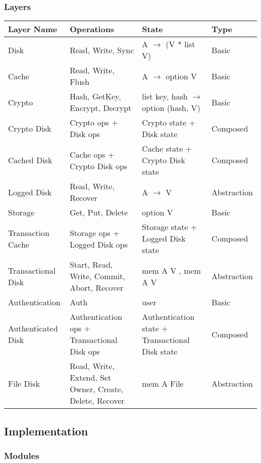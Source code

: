 \documentclass[onecolumn]{paper}
\begin{document}
		\subsubsection{Layers}
			\begin{tabularx}{\linewidth}{|L|L|L|L|}
				\hline
				Layer Name &
				Operations &
				State &
				Type \\
				\hline
				Disk &
				Read, Write, Sync &
				A $\rightarrow$ (V * list V) &
				Basic \\
				\hline
				Cache &
				Read, Write, Flush &
				A $\rightarrow$ option V &
				Basic \\
				\hline
				Crypto &
				Hash, GetKey, Encrypt, Decrypt &
				list key, 
				hash $\rightarrow$ option (hash, V) &
				Basic \\
				\hline
				Crypto Disk &
				Crypto ops + Disk ops &
				Crypto state + Disk state &
				Composed \\
				\hline
				Cached Disk &
				Cache ops + Crypto Disk ops &
				Cache state + Crypto Disk state &
				Composed \\
				\hline
				Logged Disk &
				Read, Write, Recover &
				A $\rightarrow$ V &
				Abstraction \\ 
				\hline
				Storage &
				Get, Put, Delete &
				option V &
				Basic \\
				\hline
				Transaction Cache &
				Storage ops + Logged Disk ops &
				Storage state + Logged Disk state &
				Composed \\
				\hline
				Transactional Disk &
				Start, Read, Write, Commit, Abort, Recover &
				mem A V , mem A V &
				Abstraction \\
				\hline
				Authentication &
				Auth &
				user &
				Basic \\
				\hline
				Authenticated Disk &
				Authentication ops + Transactional Disk ops &
				Authentication state + Transactional Disk state &
				Composed \\
				\hline
				File Disk &
				Read, Write, Extend, Set Owner, Create, Delete, Recover &
				mem A File &
				Abstraction \\
				\hline
			\end{tabularx}
	\subsection{Implementation}
		\subsubsection{Modules}
\end{document}
